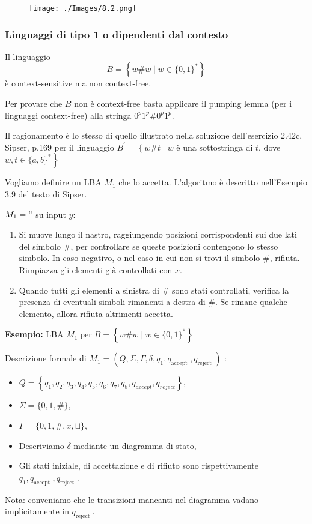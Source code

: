 \begin{figure}[hbpt!]
    \centering
    \texttt{[image: ./Images/8.2.png]}
\end{figure}
\FloatBarrier

\subsubsection{Linguaggi di tipo 1 o dipendenti dal contesto}

Il linguaggio
$$
B=\left\{w \# w \mid w \in\{0,1\}^{*}\right\}
$$
è context-sensitive ma non context-free.

Per provare che $B$ non è context-free basta applicare il pumping lemma (per i linguaggi context-free) alla stringa ${ 0}^{p} 1^{p} \#  0^{p} 1^{p} .$

Il ragionamento è lo stesso di quello illustrato nella soluzione dell'esercizio 2.42c, Sipser, p.169 per il linguaggio
$B^{\prime}=\left\{w \# t \mid w\right.$ è una sottostringa di $t$, dove $\left.w, t \in\{a, b\}^{*}\right\}$

\vspace{5mm}

Vogliamo definire un LBA $M_{1}$ che lo accetta. L'algoritmo è descritto nell'Esempio $3.9$ del testo di Sipser.

$M_{1}="$ su input $y:$
\begin{enumerate}
    \item Si muove lungo il nastro, raggiungendo posizioni corrispondenti sui due lati del simbolo \#, per controllare se queste posizioni contengono lo stesso simbolo. In caso negativo, o nel caso in cui non si trovi il simbolo \#, rifiuta. Rimpiazza gli elementi già controllati con $x$.
    \item Quando tutti gli elementi a sinistra di \# sono stati controllati, verifica la presenza di eventuali simboli rimanenti a destra di \#. Se rimane qualche elemento, allora rifiuta altrimenti accetta.
\end{enumerate}

\textbf{Esempio:} LBA $ M_{1} \operatorname{per} B=\left\{w \# w \mid w \in\{0,1\}^{*}\right\}$

Descrizione formale di $M_{1}=\left(Q, \Sigma, \Gamma, \delta, q_{1}, q_{\text {accept }}, q_{\text {reject }}\right)$ :
\begin{itemize}
    \item $Q=\left\{q_{1}, q_{2}, q_{3}, q_{4}, q_{5}, q_{6}, q_{7}, q_{8}, q_{a c c e p t}, q_{r e j e c t}\right\}$,
    \item $\Sigma=\{0,1, \#\}$,
    \item $\Gamma=\{0,1, \#, x, \sqcup\}$,
    \item Descriviamo $\delta$ mediante un diagramma di stato,
    \item Gli stati iniziale, di accettazione e di rifiuto sono rispettivamente $q_{1}, q_{\text {accept }}, q_{\text {reject }}$.
\end{itemize}
Nota: conveniamo che le transizioni mancanti nel diagramma vadano implicitamente in $q_{\text {reject }}$.

